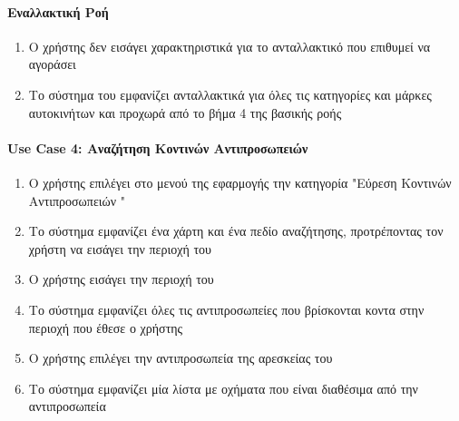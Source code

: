 \documentclass{../ol-softwaremanual}
\begin{document}
    \paragraph{Εναλλακτική Ροή}
	
	\begin{enumerate}
		\item Ο χρήστης δεν εισάγει χαρακτηριστικά για το ανταλλακτικό που επιθυμεί να αγοράσει
		\item Το σύστημα του εμφανίζει ανταλλακτικά για όλες τις κατηγορίες και μάρκες αυτοκινήτων και προχωρά από το βήμα 4 της βασικής ροής
	\end{enumerate}

     \paragraph{\en Use Case 4: \gr Αναζήτηση Κοντινών Αντιπροσωπειών}	
    
    \begin{enumerate}
    	\item Ο χρήστης επιλέγει στο μενού της εφαρμογής την κατηγορία \en"\gr Εύρεση Κοντινών Αντιπροσωπειών \en"\gr
    	\item Το σύστημα εμφανίζει ένα χάρτη και ένα πεδίο αναζήτησης, προτρέποντας τον χρήστη να εισάγει την περιοχή του
    	\item Ο χρήστης εισάγει την περιοχή του  
    	\item Το σύστημα εμφανίζει όλες τις αντιπροσωπείες που βρίσκονται κοντα στην περιοχή που έθεσε ο χρήστης
    	\item Ο χρήστης επιλέγει την αντιπροσωπεία της αρεσκείας του
    	\item Το σύστημα εμφανίζει μία λίστα με οχήματα που είναι διαθέσιμα από την αντιπροσωπεία     	
    \end{enumerate}
\end{document}
